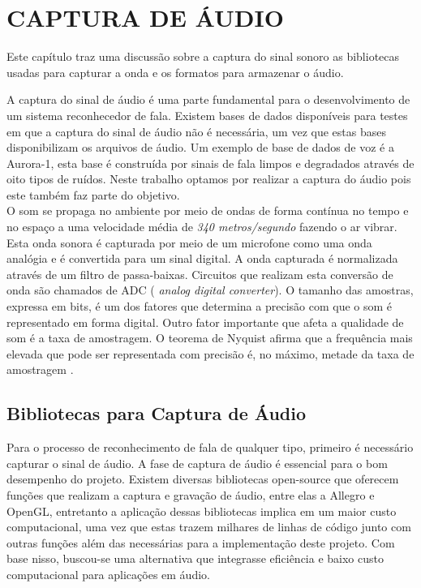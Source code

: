 \chapter{CAPTURA DE ÁUDIO}
\label{chap:cap_audio}
\thispagestyle{plain}
Este capítulo traz uma discussão sobre a captura do sinal sonoro as bibliotecas usadas para capturar a onda e os formatos para armazenar o áudio.

\quad A captura do sinal de áudio é uma parte fundamental para o desenvolvimento de um sistema reconhecedor de fala. Existem bases de dados disponíveis para testes em que a captura
do sinal de áudio não é necessária, um vez que estas bases disponibilizam os arquivos de áudio. Um exemplo de base de dados de voz é a Aurora-1, esta base é construída por sinais de fala   limpos e degradados através de oito tipos de ruídos. Neste trabalho optamos por realizar a captura do áudio pois este também faz parte do objetivo.\\ 
O som se propaga no ambiente por meio de ondas de forma contínua no tempo e no espaço a uma velocidade média de \textit{340 metros/segundo} fazendo o ar vibrar. Esta onda sonora  é capturada por meio de um microfone como uma onda analógia e  é convertida para um sinal digital. A onda capturada é normalizada através de um filtro de passa-baixas. Circuitos que realizam esta conversão de onda são chamados de  ADC (\textit{ analog digital converter}). O tamanho das amostras, expressa em bits, é um dos fatores que determina a precisão com que o som é representado em forma digital. Outro fator importante que afeta a qualidade de som é a taxa de amostragem. O teorema de Nyquist  afirma que a frequência mais elevada que pode ser representada com precisão é, no máximo, metade da taxa de amostragem \cite{nyqui}.

\section{Bibliotecas para Captura de Áudio}
\quad Para o processo de reconhecimento de fala de qualquer tipo, primeiro é necessário capturar o sinal de áudio. A fase de captura de áudio é essencial para o bom desempenho do projeto. Existem diversas bibliotecas open-source que oferecem funções que realizam a captura e gravação de áudio, entre elas a Allegro e OpenGL, entretanto a aplicação dessas bibliotecas implica em um maior custo computacional, uma vez que estas trazem milhares de linhas de código junto com outras funções além das necessárias para a implementação deste projeto. Com base nisso, buscou-se uma alternativa que integrasse eficiência e baixo custo computacional para aplicações em áudio. 
 
